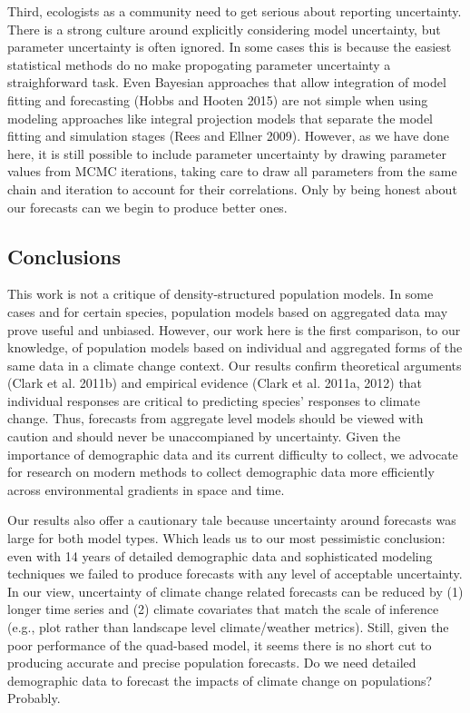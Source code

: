 \documentclass[12pt,]{article}
\begin{document}
Third, ecologists as a community need to get serious about reporting
uncertainty. There is a strong culture around explicitly considering
model uncertainty, but parameter uncertainty is often ignored. In some
cases this is because the easiest statistical methods do no make
propogating parameter uncertainty a straighforward task. Even Bayesian
approaches that allow integration of model fitting and forecasting
(Hobbs and Hooten 2015) are not simple when using modeling approaches
like integral projection models that separate the model fitting and
simulation stages (Rees and Ellner 2009). However, as we have done here,
it is still possible to include parameter uncertainty by drawing
parameter values from MCMC iterations, taking care to draw all
parameters from the same chain and iteration to account for their
correlations. Only by being honest about our forecasts can we begin to
produce better ones.

\subsection{Conclusions}\label{conclusions}

This work is not a critique of density-structured population models. In
some cases and for certain species, population models based on
aggregated data may prove useful and unbiased. However, our work here is
the first comparison, to our knowledge, of population models based on
individual and aggregated forms of the same data in a climate change
context. Our results confirm theoretical arguments (Clark et al. 2011b)
and empirical evidence (Clark et al. 2011a, 2012) that individual
responses are critical to predicting species' responses to climate
change. Thus, forecasts from aggregate level models should be viewed
with caution and should never be unaccompianed by uncertainty. Given the
importance of demographic data and its current difficulty to collect, we
advocate for research on modern methods to collect demographic data more
efficiently across environmental gradients in space and time.

Our results also offer a cautionary tale because uncertainty around
forecasts was large for both model types. Which leads us to our most
pessimistic conclusion: even with 14 years of detailed demographic data
and sophisticated modeling techniques we failed to produce forecasts
with any level of acceptable uncertainty. In our view, uncertainty of
climate change related forecasts can be reduced by (1) longer time
series and (2) climate covariates that match the scale of inference
(e.g., plot rather than landscape level climate/weather metrics). Still,
given the poor performance of the quad-based model, it seems there is no
short cut to producing accurate and precise population forecasts. Do we
need detailed demographic data to forecast the impacts of climate change
on populations? Probably.
\end{document}
